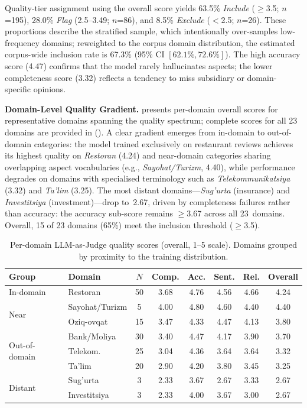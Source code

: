 \documentclass[bdcc,article,submit,moreauthors]{Definitions/mdpi}
\begin{document}
Quality-tier assignment using the overall score yields 63.5\% \emph{Include} ($\geq$3.5; $n$=195), 28.0\% \emph{Flag} (2.5--3.49; $n$=86), and 8.5\% \emph{Exclude} ($<$2.5; $n$=26). These proportions describe the stratified sample, which intentionally over-samples low-frequency domains; reweighted to the corpus domain distribution, the estimated corpus-wide inclusion rate is 67.3\% (95\% CI $[62.1\%, 72.6\%]$). The high accuracy score (4.47) confirms that the model rarely hallucinates aspects; the lower completeness score (3.32) reflects a tendency to miss subsidiary or domain-specific opinions.

\textbf{Domain-Level Quality Gradient.}  presents per-domain overall scores for representative domains spanning the quality spectrum; complete scores for all 23 domains are provided in  (). A clear gradient emerges from in-domain to out-of-domain categories: the model trained exclusively on restaurant reviews achieves its highest quality on \emph{Restoran} (4.24) and near-domain categories sharing overlapping aspect vocabularies (e.g., \emph{Sayohat/Turizm}, 4.40), while performance degrades on domains with specialised terminology such as \emph{Telekommunikatsiya} (3.32) and \emph{Ta'lim} (3.25). The most distant domains---\emph{Sug'urta} (insurance) and \emph{Investitsiya} (investment)---drop to~2.67, driven by completeness failures rather than accuracy: the accuracy sub-score remains $\geq$3.67 across all 23~domains. Overall, 15 of 23 domains (65\%) meet the inclusion threshold ($\geq$3.5).

\begin{table}[t]
\centering
\caption{Per-domain LLM-as-Judge quality scores (overall, 1--5 scale). Domains grouped by proximity to the training distribution.}
\label{tab:domain_quality}
\setlength{\tabcolsep}{4pt}
\begin{tabular}{llcccccc}
\toprule
\textbf{Group} & \textbf{Domain} & $N$ & \textbf{Comp.} & \textbf{Acc.} & \textbf{Sent.} & \textbf{Rel.} & \textbf{Overall} \\
\midrule
In-domain    & Restoran       & 50 & 3.68 & 4.76 & 4.56 & 4.66 & 4.24 \\
\midrule
\multirow{2}{*}{Near}
             & Sayohat/Turizm & 5  & 4.00 & 4.80 & 4.60 & 4.40 & 4.40 \\
             & Oziq-ovqat     & 15 & 3.47 & 4.33 & 4.47 & 4.13 & 3.80 \\
\midrule
\multirow{3}{*}{Out-of-domain}
             & Bank/Moliya    & 30 & 3.40 & 4.47 & 4.17 & 3.90 & 3.70 \\
             & Telekom.       & 25 & 3.04 & 4.36 & 3.64 & 3.64 & 3.32 \\
             & Ta'lim         & 20 & 2.90 & 4.20 & 3.80 & 3.45 & 3.25 \\
\midrule
\multirow{2}{*}{Distant}
             & Sug'urta       & 3  & 2.33 & 3.67 & 2.67 & 3.33 & 2.67 \\
             & Investitsiya   & 3  & 2.33 & 4.00 & 3.67 & 3.00 & 2.67 \\
\bottomrule
\end{tabular}
\end{table}
\end{document}
